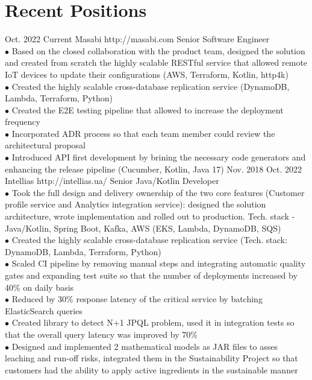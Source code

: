 \documentclass[10pt]{article} %
\begin{document}
\section{Recent Positions}
\job
{Oct. 2022 }{ Current}
{Masabi}
{http://masabi.com}
{Senior Software Engineer}
{
\textbf{}   
\\$\bullet$ Based on the closed collaboration with the product team, designed the solution and created from scratch the highly scalable RESTful service that allowed remote IoT devices to update their configurations (AWS, Terraform, Kotlin, http4k)
\\$\bullet$ Created the highly scalable cross-database replication service (DynamoDB, Lambda, Terraform, Python)
\\$\bullet$ Created the E2E testing pipeline that allowed to increase the deployment frequency
\\$\bullet$ Incorporated ADR process so that each team member could review the architectural proposal
\\$\bullet$ Introduced API first development by brining the necessary code generators and enhancing the release pipeline (Cucumber, Kotlin, Java 17)
 }
\job
{Nov. 2018 }{ Oct. 2022}
{Intellias}
{http://intellias.ua/}
{Senior Java/Kotlin Developer}
{
\textbf{}   
\\$\bullet$ Took the full design and delivery ownership of the two core features (Customer profile service and Analytics integration service): designed the solution architecture, wrote implementation and rolled out to production. Tech. stack - Java/Kotlin, Spring Boot, Kafka, AWS (EKS, Lambda, DynamoDB, SQS)
\\$\bullet$ Created the highly scalable cross-database replication service (Tech. stack: DynamoDB, Lambda, Terraform, Python)
\\$\bullet$ Scaled CI pipeline by removing manual steps and integrating automatic quality gates and expanding test suite so that the number of deployments increased by 40\% on daily basis 
\\$\bullet$ Reduced by 30\% response latency of the critical service by batching ElasticSearch queries 
\\$\bullet$ Created library to detect N+1 JPQL problem, used it in integration tests so that the overall query latency was improved by 70\% 
\\$\bullet$ Designed and implemented 2 mathematical models as JAR files to asses leaching and run-off risks, 
integrated them in the Sustainability Project so that customers had the ability to apply active ingredients in the sustainable manner
 }
\end{document}
